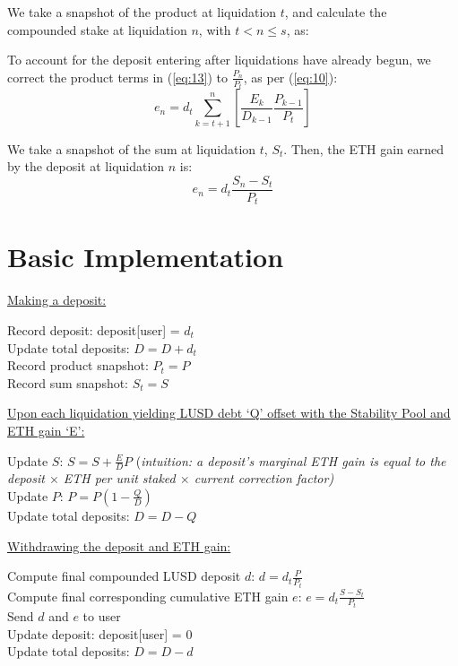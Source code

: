 \documentclass[reqno]{article}
\begin{document}
We take a snapshot of the product at liquidation $t$, and calculate the compounded stake at liquidation $n$, with $t < n \leq s$, as:

\bigskip
To account for the deposit entering after liquidations have already begun, we correct the product terms in (\ref{eq:13}) to $\frac{P_n}{P_t}$, as per (\ref{eq:10}):
\begin{equation} 
    e_n = d_t\sum^n_{k=t+1}\left[\frac{E_k}{D_{k-1}}\frac{P_{k-1}}{P_t}\right]
\end{equation}

\bigskip
We take a snapshot of the sum at liquidation $t$, $S_t$. Then, the ETH gain earned by the deposit at liquidation $n$ is:
\begin{equation} 
e_n=d_t\frac{S_n-S_t}{P_t}
\end{equation}

\bigskip
\section{Basic Implementation}
\underline{Making a deposit:}

Record deposit: deposit[user] = $d_t$\\
Update total deposits: $D = D + d_t$\\
Record product snapshot: $P_t = P$\\
Record sum snapshot: $S_t = S$

\bigskip
\underline{Upon each liquidation yielding LUSD debt ‘Q’ offset with the Stability Pool and ETH gain ‘E’:}

Update $S$: $S = S + \frac{E}{D}P$ (\textit{intuition: a deposit’s marginal ETH gain is equal to the deposit $\times$ ETH per unit staked $\times$ current correction factor)}\\
Update $P$: $P = P(1 - \frac{Q}{D})$\\
Update total deposits: $D = D - Q$

\bigskip
\underline{Withdrawing the deposit and ETH gain:}

Compute final compounded LUSD deposit $d$: $d = d_t\frac{P}{P_t}$\\
Compute final corresponding cumulative ETH gain $e$: $e = d_t\frac{S - S_t}{P_t}$\\
Send $d$ and $e$ to user\\
Update deposit: deposit[user] = 0\\
Update total deposits: $D = D - d$\\

\bigskip
\end{document}

